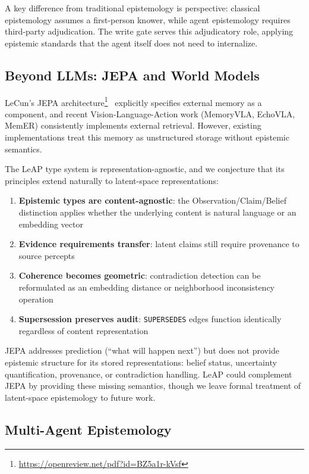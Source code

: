 \documentclass[11pt,letterpaper]{article}
\begin{document}
A key difference from traditional epistemology is perspective: classical epistemology assumes a first-person knower, while agent epistemology requires third-party adjudication. The write gate serves this adjudicatory role, applying epistemic standards that the agent itself does not need to internalize.

\subsection{Beyond LLMs: JEPA and World Models}

LeCun's JEPA architecture\footnote{\url{https://openreview.net/pdf?id=BZ5a1r-kVsf}}~\cite{lecun2022path} explicitly specifies external memory as a component, and recent Vision-Language-Action work (MemoryVLA, EchoVLA, MemER) consistently implements external retrieval. However, existing implementations treat this memory as unstructured storage without epistemic semantics.

The LeAP type system is representation-agnostic, and we conjecture that its principles extend naturally to latent-space representations:
\begin{enumerate}[noitemsep]
    \item \textbf{Epistemic types are content-agnostic}: the Observation/Claim/Belief distinction applies whether the underlying content is natural language or an embedding vector
    \item \textbf{Evidence requirements transfer}: latent claims still require provenance to source percepts
    \item \textbf{Coherence becomes geometric}: contradiction detection can be reformulated as an embedding distance or neighborhood inconsistency operation
    \item \textbf{Supersession preserves audit}: \texttt{SUPERSEDES} edges function identically regardless of content representation
\end{enumerate}

JEPA addresses prediction (``what will happen next'') but does not provide epistemic structure for its stored representations: belief status, uncertainty quantification, provenance, or contradiction handling. LeAP could complement JEPA by providing these missing semantics, though we leave formal treatment of latent-space epistemology to future work.

\subsection{Multi-Agent Epistemology}
\end{document}
